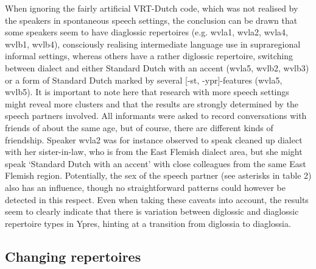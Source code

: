 \documentclass[output=paper]{LSP/langsci}
\begin{document}
When ignoring the fairly artificial VRT-Dutch code, which was not realised by the speakers in spontaneous speech settings, the conclusion can be drawn that some speakers seem to have diaglossic repertoires (e.g. wvla1, wvla2, wvla4, wvlb1, wvlb4), consciously realising intermediate language use in supraregional informal settings, whereas others have a rather diglossic repertoire, switching between dialect and either Standard Dutch with an accent (wvla5, wvlb2, wvlb3) or a form of Standard Dutch marked by several [-st, -ypr]-features (wvla5, wvlb5). It is important to note here that research with more speech settings might reveal more clusters and that the results are strongly determined by the speech partners involved. All informants were asked to record conversations with friends of about the same age, but of course, there are different kinds of friendship. Speaker wvla2 was for instance observed to speak cleaned up dialect with her sister-in-law, who is from the East Flemish dialect area, but she might speak ‘Standard Dutch with an accent’ with close colleagues from the same East Flemish region. Potentially, the sex of the speech partner (see asterisks in table 2) also has an influence, though no straightforward patterns could however be detected in this respect. Even when taking these caveats into account, the results seem to clearly indicate that there is variation between diglossic and diaglossic repertoire types in Ypres, hinting at a transition from diglossia to diaglossia. 

\subsection{Changing repertoires}
\end{document}
